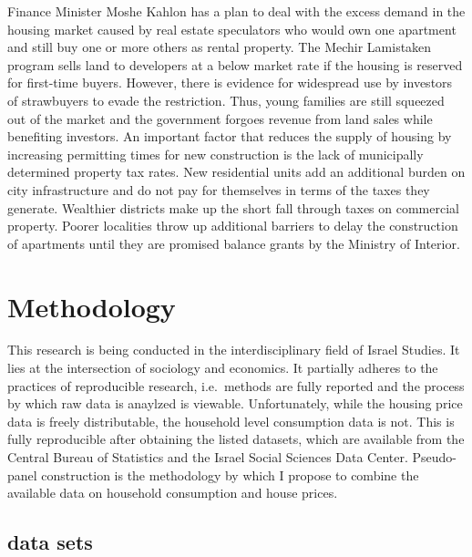 \documentclass[12pt,a4paper,]{article}
\begin{document}
Finance Minister Moshe Kahlon has a plan to deal with the excess demand
in the housing market caused by real estate speculators who would own
one apartment and still buy one or more others as rental property. The
Mechir Lamistaken program sells land to developers at a below market
rate if the housing is reserved for first-time buyers. However, there is
evidence for widespread use by investors of strawbuyers to evade the
restriction. Thus, young families are still squeezed out of the market
and the government forgoes revenue from land sales while benefiting
investors. An important factor that reduces the supply of housing by
increasing permitting times for new construction is the lack of
municipally determined property tax rates. New residential units add an
additional burden on city infrastructure and do not pay for themselves
in terms of the taxes they generate. Wealthier districts make up the
short fall through taxes on commercial property. Poorer localities throw
up additional barriers to delay the construction of apartments until
they are promised balance grants by the Ministry of Interior.

\section{Methodology}\label{methodology}

This research is being conducted in the interdisciplinary field of
Israel Studies. It lies at the intersection of sociology and economics.
It partially adheres to the practices of reproducible research,
i.e.~methods are fully reported and the process by which raw data is
anaylzed is viewable. Unfortunately, while the housing price data is
freely distributable, the household level consumption data is not. This
is fully reproducible after obtaining the listed datasets, which are
available from the Central Bureau of Statistics and the Israel Social
Sciences Data Center. Pseudo-panel construction is the methodology by
which I propose to combine the available data on household consumption
and house prices.

\subsection{data sets}\label{data-sets}
\end{document}
